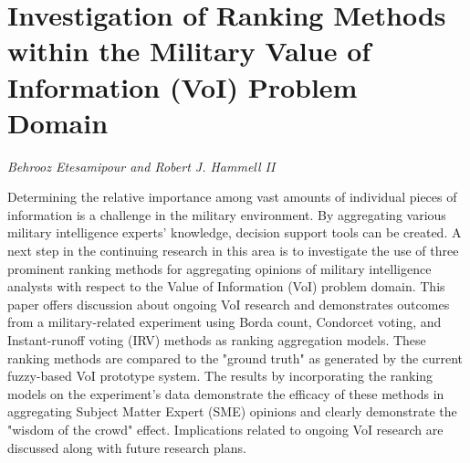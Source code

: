 \documentclass[../booklet.tex]{subfiles}
\begin{document}
\section[Investigation of Ranking Methods within the Military Value of Information (VoI) Problem Domain. {\it Behrooz Etesamipour and Robert J. Hammell II}]{Investigation of Ranking Methods within the Military Value of Information (VoI) Problem Domain}
 

\begin{center}
  {\it Behrooz Etesamipour and Robert J. Hammell II}
\end{center}

\vskip 0.8cm

Determining the relative importance among vast amounts of individual pieces of information is a challenge in the military environment. By aggregating various military intelligence experts' knowledge, decision support tools can be created. A next step in the continuing research in this area is to investigate the use of three prominent ranking methods for aggregating opinions of military intelligence analysts with respect to the Value of Information (VoI) problem domain. This paper offers discussion about ongoing VoI research and demonstrates outcomes from a military-related experiment using Borda count, Condorcet voting, and Instant-runoff voting (IRV) methods as ranking aggregation models. These ranking methods are compared to the "ground truth" as generated by the current fuzzy-based VoI prototype system. The results by incorporating the ranking models on the experiment's data demonstrate the efficacy of these methods in aggregating Subject Matter Expert (SME) opinions and clearly demonstrate the "wisdom of the crowd" effect. Implications related to ongoing VoI research are discussed along with future research plans.
\end{document}
